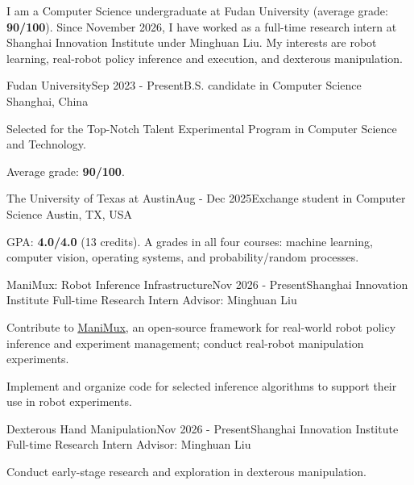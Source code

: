 \documentclass[10pt,a4paper]{article}
\begin{document}
I am a Computer Science undergraduate at Fudan University (average grade: \textbf{90/100}). Since November 2026, I have worked as a full-time research intern at Shanghai Innovation Institute under Minghuan Liu. My interests are robot learning, real-robot policy inference and execution, and dexterous manipulation.

\begin{cventry}{Fudan University}{Sep 2023 - Present}{B.S. candidate in Computer Science \textbar{} Shanghai, China}
\begin{cvitems}
\item Selected for the Top-Notch Talent Experimental Program in Computer Science and Technology.
\item Average grade: \textbf{90/100}.
\end{cvitems}
\end{cventry}

\begin{cventry}{The University of Texas at Austin}{Aug - Dec 2025}{Exchange student in Computer Science \textbar{} Austin, TX, USA}
\begin{cvitems}
\item GPA: \textbf{4.0/4.0} (13 credits). A grades in all four courses: machine learning, computer vision, operating systems, and probability/random processes.
\end{cvitems}
\end{cventry}

\begin{cventry}{ManiMux: Robot Inference Infrastructure}{Nov 2026 - Present}{Shanghai Innovation Institute \textbar{} Full-time Research Intern \textbar{} Advisor: Minghuan Liu}
\begin{cvitems}
\item Contribute to \href{https://github.com/SII-LiuLab/manimux}{ManiMux}, an open-source framework for real-world robot policy inference and experiment management; conduct real-robot manipulation experiments.
\item Implement and organize code for selected inference algorithms to support their use in robot experiments.
\end{cvitems}
\end{cventry}

\begin{cventry}{Dexterous Hand Manipulation}{Nov 2026 - Present}{Shanghai Innovation Institute \textbar{} Full-time Research Intern \textbar{} Advisor: Minghuan Liu}
\begin{cvitems}
\item Conduct early-stage research and exploration in dexterous manipulation.
\end{cvitems}
\end{cventry}
\end{document}

